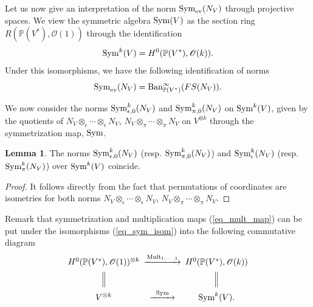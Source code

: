 \documentclass[12pt]{article}
\numberwithin{equation}{section}
\theoremstyle{theorem}
\theoremstyle{definition}
\newtheorem{lem}[thm]{Lemma}
\theoremstyle{remark}
\newcommand{\sym}{{\rm{Sym}}}
\begin{document}
	\par 
	Let us now give an interpretation of the norm $\sym_{{\rm{ev}}}(N_V)$ through projective spaces.
	We view the symmetric algebra $\sym(V)$ as the section ring $R(\mathbb{P}(V^*), \mathscr{O}(1))$ through the identification
	\begin{equation}\label{eq_sym_isom}
		\sym^k(V) = H^0(\mathbb{P}(V^*), \mathscr{O}(k)).
	\end{equation}
	Under this isomorphisms, we have the following identification of norms
	\begin{equation}\label{eq_sum_ev_norm}
		\sym_{{\rm{ev}}}(N_V) = {\rm{Ban}}^{\infty}_{\mathbb{P}(V^*)}(FS(N_V)).
	\end{equation}
	\par 
	We now consider the norms $\sym^k_{\epsilon, 0}(N_V)$ and $\sym^k_{\pi, 0}(N_V)$ on $\sym^k(V)$, given by the quotients of $N_V \otimes_{\epsilon} \cdots \otimes_{\epsilon} N_V$, $N_V \otimes_{\pi} \cdots \otimes_{\pi} N_V$ on $V^{\otimes k}$ through the symmetrization map, ${\rm{Sym}}$. 
	\begin{lem}\label{lem_sym_quot_inj}
		The norms $\sym^k_{\epsilon, 0}(N_V)$ (resp. $\sym^k_{\pi, 0}(N_V)$) and $\sym^k_{\epsilon}(N_V)$ (resp. $\sym^k_{\pi}(N_V)$) over $\sym^k(V)$ coincide.
	\end{lem} 
	\begin{proof}
		It follows directly from the fact that permutations of coordinates are isometries for both norms $N_V \otimes_{\epsilon} \cdots \otimes_{\epsilon} N_V$, $N_V \otimes_{\pi} \cdots \otimes_{\pi} N_V$. 
	\end{proof}
	Remark that symmetrization and multiplication maps (\ref{eq_mult_map}) can be put under the isomorphisms (\ref{eq_sym_isom}) into the following commutative diagram 
	\begin{equation}\label{eq_comm_diag222}
	\begin{CD}
		H^0(\mathbb{P}(V^*), \mathscr{O}(1))^{\otimes k}  @> {\rm{Mult}}_{1, \cdots, 1} >> H^0(\mathbb{P}(V^*), \mathscr{O}(k)) 
		\\
		@| {}  @| {} 
		\\
		V^{\otimes k}  @> \sym >> \sym^k(V).
	\end{CD}
	\end{equation}
\end{document}
